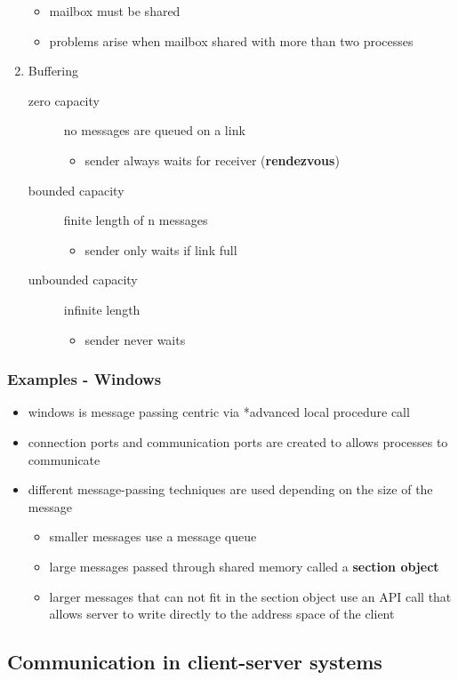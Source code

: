 \documentclass[11pt]{article}
\begin{document}
\begin{enumerate}
\begin{itemize}
\item mailbox must be shared
\item problems arise when mailbox shared with more than two processes
\end{itemize}
\item Buffering
\label{sec:org6433312}
\begin{description}
\item[{zero capacity}] no messages are queued on a link
\begin{itemize}
\item sender always waits for receiver (\textbf{rendezvous})
\end{itemize}
\item[{bounded capacity}] finite length of n messages
\begin{itemize}
\item sender only waits if link full
\end{itemize}
\item[{unbounded capacity}] infinite length
\begin{itemize}
\item sender never waits
\end{itemize}
\end{description}
\end{enumerate}
\subsubsection{Examples - Windows}
\label{sec:orgcfe51c3}
\begin{itemize}
\item windows is message passing centric via *advanced local procedure call
\item connection ports and communication ports are created to allows processes to communicate
\item different message-passing techniques are used depending on the size of the message
\begin{itemize}
\item smaller messages use a message queue
\item large messages passed through shared memory called a \textbf{section object}
\item larger messages that can not fit in the section object use an API call that allows server to write directly to the address space of the client
\end{itemize}
\end{itemize}
\subsection{Communication in client-server systems}
\label{sec:orgdca6661}
\end{document}
